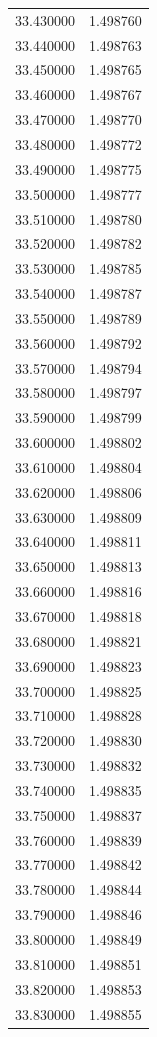 \begin{tabular}{rr}
33.430000 & 1.498760 \\
33.440000 & 1.498763 \\
33.450000 & 1.498765 \\
33.460000 & 1.498767 \\
33.470000 & 1.498770 \\
33.480000 & 1.498772 \\
33.490000 & 1.498775 \\
33.500000 & 1.498777 \\
33.510000 & 1.498780 \\
33.520000 & 1.498782 \\
33.530000 & 1.498785 \\
33.540000 & 1.498787 \\
33.550000 & 1.498789 \\
33.560000 & 1.498792 \\
33.570000 & 1.498794 \\
33.580000 & 1.498797 \\
33.590000 & 1.498799 \\
33.600000 & 1.498802 \\
33.610000 & 1.498804 \\
33.620000 & 1.498806 \\
33.630000 & 1.498809 \\
33.640000 & 1.498811 \\
33.650000 & 1.498813 \\
33.660000 & 1.498816 \\
33.670000 & 1.498818 \\
33.680000 & 1.498821 \\
33.690000 & 1.498823 \\
33.700000 & 1.498825 \\
33.710000 & 1.498828 \\
33.720000 & 1.498830 \\
33.730000 & 1.498832 \\
33.740000 & 1.498835 \\
33.750000 & 1.498837 \\
33.760000 & 1.498839 \\
33.770000 & 1.498842 \\
33.780000 & 1.498844 \\
33.790000 & 1.498846 \\
33.800000 & 1.498849 \\
33.810000 & 1.498851 \\
33.820000 & 1.498853 \\
33.830000 & 1.498855 \\

\end{tabular}
